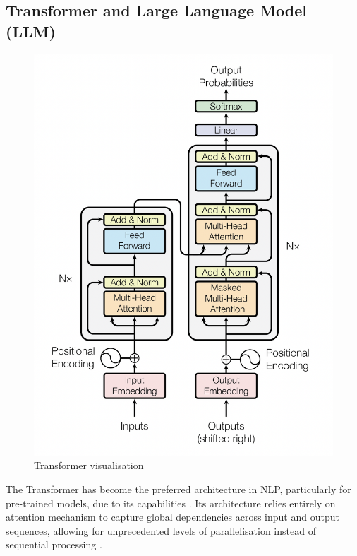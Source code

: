 
\subsection{Transformer and Large Language Model (LLM)}

\begin{figure}[htbp]
    \centering
    \includegraphics[width=0.65\linewidth]{images/transformer.png}
    \caption{Transformer visualisation \cite{vaswani-2023-attention}}
    \label{fig:transformer}
\end{figure}

The Transformer has become the preferred architecture in NLP, particularly for pre-trained models, due to its capabilities \cite{lin-2022-survey-transformers}. Its architecture relies entirely on attention mechanism to capture global dependencies across input and output sequences, allowing for unprecedented levels of parallelisation instead of sequential processing \cite{vaswani-2023-attention}.


